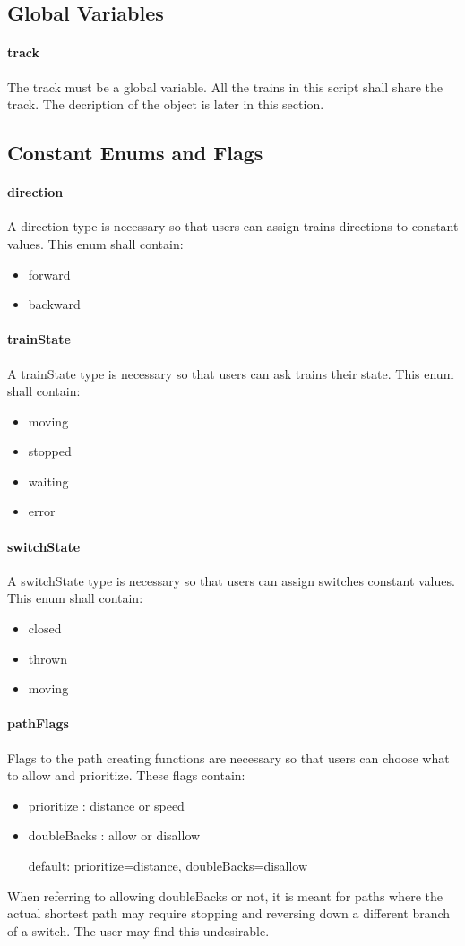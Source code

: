 \documentclass[a4paper,11pt,notitlepage]{article}
\begin{document}
\subsection{Global Variables}
\paragraph{track} The track must be a global variable. All the trains in this script shall share the track. The decription of the object is later in this section.
\subsection{Constant Enums and Flags}
\paragraph{direction} A direction type is necessary so that users can assign trains directions to constant values. This enum shall contain:
\begin{itemize}
\item forward
\item backward
\end{itemize}
\paragraph{trainState} A trainState type is necessary so that users can ask trains their state. This enum shall contain:
\begin{itemize}
\item moving
\item stopped
\item waiting
\item error
\end{itemize}
\paragraph{switchState} A switchState type is necessary so that users can assign switches constant values. This enum shall contain:
\begin{itemize}
\item closed
\item thrown
\item moving
\end{itemize}
\paragraph{pathFlags} Flags to the path creating functions are necessary so that users can choose what to allow and prioritize. These flags contain:
\begin{itemize}
\item prioritize : distance or speed
\item doubleBacks : allow or disallow
\item[default:] prioritize=distance, doubleBacks=disallow
\end{itemize}
When referring to allowing doubleBacks or not, it is meant for paths where the actual shortest path may require stopping and reversing down a different branch of a switch. The user may find this undesirable.
\end{document}

